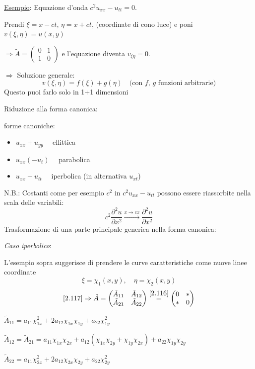 \documentclass[a4paper,11pt]{report}
\begin{document}
\underline{Esempio}: Equazione d'onda $c^2u_{xx} - u_{tt}=0$.

Prendi $\xi=x-ct$, $\eta = x+ct$, (coordinate di cono luce) e poni $v(\xi,\eta) = u(x,y)$ 

$\Rightarrow \tilde{A}=\left(\begin{matrix} 0 & 1\\ 1 & 0 \end{matrix}\right)$ e l'equazione diventa $v_{\xi\eta}=0$. 

$\Rightarrow$ Soluzione generale:
\[
v(\xi,\eta)=f(\xi) + g(\eta) \quad \text{(con $f$, $g$ funzioni arbitrarie)}
\]
Questo puoi farlo solo in 1+1 dimensioni

Riduzione alla forma canonica:

forme canoniche:
\begin{itemize}
\item[] $u_{xx} + u_{yy} \quad$ ellittica
\item[] $u_{xx} (- u_t) \quad$ parabolica
\item[] $u_{xx} - u_{tt} \quad$ iperbolica (in alternativa $u_{xt}$)
\end{itemize}
N.B.: Costanti come per esempio $c^2$ in $c^2 u_{xx}-u_{tt}$ possono essere riassorbite nella scala delle variabili:
\[
c^2 \frac{\partial^2 u}{\partial x^2} \overset{x\to cx}{\longrightarrow} \frac{\partial^2 u}{\partial x^2}
\]
Trasformazione di una parte principale generica nella forma canonica:

\medskip

\emph{Caso iperbolico}:

L'esempio sopra suggerisce di prendere le curve caratteristiche come nuove linee coordinate 
\[
\xi=\chi_1(x,y),\quad \eta=\chi_2(x,y)
\]
\[
\eqref{2.117}\Rightarrow \tilde{A} = \left(\begin{matrix}
\tilde{A}_{11} & \tilde{A}_{12} \\
\tilde{A}_{21} & \tilde{A}_{22}
\end{matrix} \right)\overset{\eqref{2.116}}{=}\left(\begin{matrix}
0 & *\\
* & 0
\end{matrix}\right)
\]

$\tilde{A}_{11}=a_{11}\chi_{1x}^2 + 2a_{12}\chi_{1x}\chi_{1y} + a_{22}\chi_{1y}^2$

$\tilde{A}_{12}=\tilde{A}_{21}=a_{11}\chi_{1x}\chi_{2x} + a_{12}(\chi_{1x}\chi_{2y} + \chi_{1y}\chi_{2x}) + a_{22}\chi_{1y}\chi_{2y}$

$\tilde{A}_{22}=a_{11}\chi_{2x}^2 + 2a_{12}\chi_{2x}\chi_{2y} + a_{22}\chi_{2y}^2$
\end{document}
